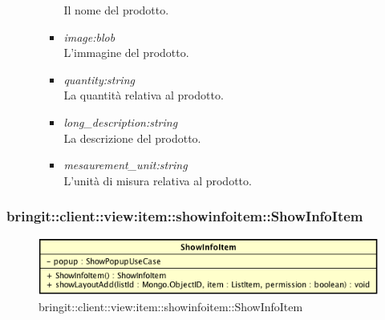 \begin{itemize}
\begin{itemize}
\begin{itemize}
			Il nome del prodotto.
			\item \textit{image:blob}\\
			L'immagine del prodotto.
			\item \textit{quantity:string}\\
			La quantità relativa al prodotto.
			\item \textit{long_description:string}\\
			La descrizione del prodotto.
			\item \textit{mesaurement\_unit:string}\\
			L'unità di misura relativa al prodotto.
					\end{itemize}
	\end{itemize}
\end{itemize}

\subsubsection{bringit::client::view:item::showinfoitem::ShowInfoItem}

\label{bringit::client::view:item::showinfoitem::ShowInfoItem}
\begin{figure}[H]
	\centering
	\includegraphics[scale=0.5]{Sezioni/SottosezioniST/img/app/ShowInfoItem.png}
	\caption{bringit::client::view:item::showinfoitem::ShowInfoItem}
\end{figure}

